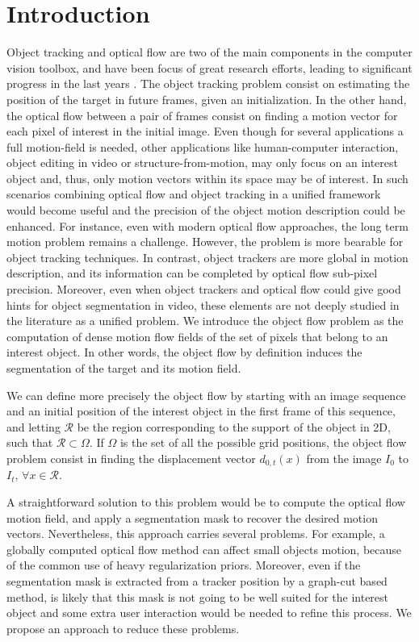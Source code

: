 \section{Introduction}
\label{sec:introduction}

Object tracking and optical flow are two of the main components in the
computer vision toolbox, and have been focus of great research efforts, 
leading to significant progress in the last years \cite{c16}\cite{c17}. 
The object tracking problem consist on estimating the 
position of the target in future frames, given an initialization. In the
other hand, the optical flow between a pair of frames consist on finding a motion vector 
for each pixel of interest in the initial image. Even though for several
applications a full motion-field is needed, other applications like
human-computer interaction, object editing in video or structure-from-motion,
may only focus on an interest object and, thus, only motion vectors within its 
space may be of interest. 
In such scenarios combining optical flow and object tracking in a unified 
framework would become useful and the precision of the object motion description 
could be enhanced. For instance, even with modern optical flow approaches, 
the long term motion problem remains a challenge. However, the problem is more 
bearable for object tracking techniques. In contrast, object trackers are more global 
in motion description, and its information can be completed by optical flow sub-pixel 
precision. Moreover,  even when object
trackers and optical flow could give good hints for object segmentation in video, 
these elements are not deeply studied in the literature as a unified problem.
We introduce the object flow problem as the computation of dense motion 
flow fields of the set of pixels that belong to an interest object. In other words, 
the object flow by definition induces the segmentation of the target and its motion field.

We can define more precisely the object flow by starting with an image sequence and an initial 
position of the interest object in the first frame of this sequence, and letting $\mathcal{R}$ be the region corresponding to the support of the object in 2D, such that 
$\mathcal{R} \subset \Omega$. If $\Omega$ is the set of all the possible grid positions, 
the object flow problem consist in finding the displacement vector $d_{0,t}(x)$ from the image $I_{0}$ to $I_{t}$, $\forall x \in \mathcal{R}$.

A straightforward solution to this problem would be to compute the optical flow motion field, and apply 
a segmentation mask to recover the desired motion vectors. Nevertheless, this approach carries several 
problems. For example, a globally computed optical flow method can affect small objects motion, because of 
the common use of heavy regularization priors. Moreover, even if the segmentation mask is extracted from a 
tracker position by a graph-cut based method, is likely that this mask is not going to be well suited for the 
interest object and some extra user interaction would be needed to refine this process. We propose an approach 
to reduce these problems.

